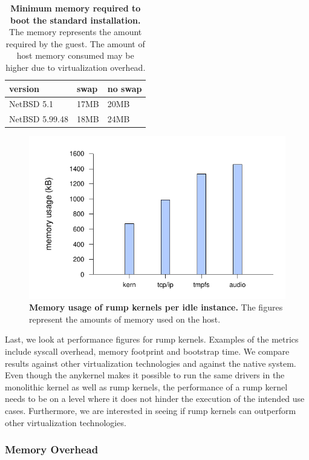 \begin{table}[t]
\begin{tabular}{|l|l|l|}
\hline
version & swap & no swap \\
\hline
\hline
NetBSD 5.1 & 17MB & 20MB \\
\hline
NetBSD 5.99.48 & 18MB & 24MB \\
\hline
\end{tabular}
\caption[Minimum memory required to boot the standard installation]{
\textbf{Minimum memory required to boot the standard installation.}
The memory represents the amount required by the guest.  The amount
of host memory consumed may be higher due to virtualization overhead.
}
\label{tab:minbootmem}
\end{table}
\begin{figure}[t]
\includegraphics{memusage}
\caption[Memory usage of rump kernels per idle instance]{
\textbf{Memory usage of rump kernels per idle instance.}
The figures represent the amounts of memory used on the host.
}
\label{fig:memusage}
\end{figure}

Last, we look at performance figures for rump kernels.
Examples of the metrics include syscall overhead, memory footprint
and bootstrap time.  We compare results against other virtualization
technologies and against the native system.  Even though the anykernel
makes it possible to run the same drivers in the monolithic kernel as
well as rump kernels, the performance of a rump kernel needs to be on a
level where it does not hinder the execution of the intended use cases.
Furthermore, we are interested in seeing if rump kernels can outperform
other virtualization technologies.

\subsubsection{Memory Overhead}


